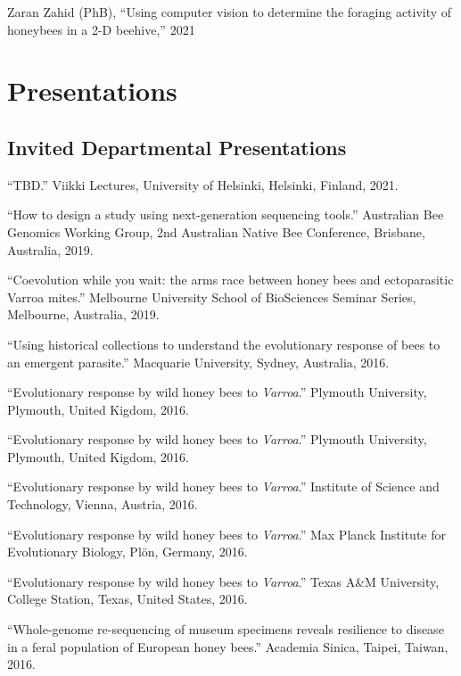 \documentclass[11pt]{article}
\def\printdate#1{\xprintdate#1-}
\def\xprintdate#1-#2-#3-{#1}
\begin{document}
\ind Zaran Zahid (PhB), ``Using computer vision to determine the
foraging activity of honeybees in a 2-D beehive,'' 2021


\section{Presentations}

\subsection{Invited Departmental Presentations}

\ind ``TBD.'' Viikki Lectures, University of Helsinki, Helsinki,
Finland, \printdate{2021-00-00}.




\ind ``How to design a study using next-generation sequencing
tools.'' Australian Bee Genomics Working Group, 2nd Australian Native
Bee Conference, Brisbane, Australia, \printdate{2019-12-00}.


\ind ``Coevolution while you wait: the arms race between honey bees and
ectoparasitic Varroa mites.'' Melbourne University School of BioSciences
Seminar Series, Melbourne, Australia, \printdate{2019-00-00}.








\ind ``Using historical collections to understand the evolutionary
response of bees to an emergent parasite.'' Macquarie
University, Sydney, Australia, \printdate{2016-00-00}.


\ind ``Evolutionary response by wild honey bees to
\textit{Varroa}.'' Plymouth University, Plymouth, United
Kigdom, \printdate{2016-00-00}.


\ind ``Evolutionary response by wild honey bees to
\textit{Varroa}.'' Plymouth University, Plymouth, United
Kigdom, \printdate{2016-00-00}.


\ind ``Evolutionary response by wild honey bees to
\textit{Varroa}.'' Institute of Science and Technology, Vienna,
Austria, \printdate{2016-00-00}.


\ind ``Evolutionary response by wild honey bees to
\textit{Varroa}.'' Max Planck Institute for Evolutionary Biology, Plön,
Germany, \printdate{2016-00-00}.


\ind ``Evolutionary response by wild honey bees to
\textit{Varroa}.'' Texas A\&M University, College Station, Texas, United
States, \printdate{2016-00-00}.


\ind ``Whole-genome re-sequencing of museum specimens reveals resilience
to disease in a feral population of European honey bees.'' Academia
Sinica, Taipei, Taiwan, \printdate{2016-00-00}.
\end{document}
